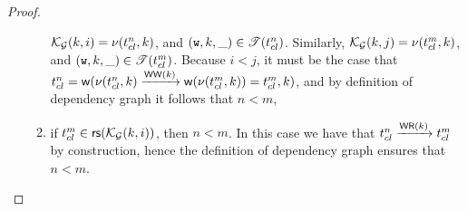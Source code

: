 \begin{proof}
\begin{enumerate}[label=(\roman*)]
\begin{enumerate}
$\mathcal{K}_{\mathcal{G}}(k, i) = \nu(t_{{cl}}^{n}, k)$, and $(\textnormal{\texttt w}, k, \_) \in \mathscr{T}(t_{{cl}}^{n})$. 
Similarly, $\mathcal{K}_{\mathcal{G}}(k, j) = \nu(t_{{cl}}^{m}, k)$, and $(\textnormal{\texttt w}, k, \_) \in \mathscr{T}(t_{{cl}}^{m})$. 
Because $i < j$, it must be the case that $\txid_{\cl}^{n} = \wtOf(\ver(\txid_{\cl}^{n}, \key) \toEDGE{\WW(\key)} 
\wtOf(\ver(\txid_{\cl}^{m}, \key)) = \txid_{\cl}^{m}, \key)$, and by definition of dependency graph it follows that 
$n < m$, 
\item if $\txid_{\cl}^{m} \in \rsOf(\mkvs_{\Gr}(\key, i))$, then $n < m$. In this case we have that 
$t_{{cl}}^{n} \xrightarrow{\mathsf{WR}(k)} t_{{cl}}^{m}$ by construction, hence the definition 
of dependency graph ensures that $n < m$. 
\end{enumerate}
\end{enumerate}
\end{proof}

